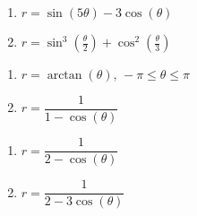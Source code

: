 \documentclass{ximera}
\begin{document}
\begin{multicols}{2} 

\begin{enumerate}

\setcounter{enumi}{\value{HW}}

\item $r = \sin(5\theta) - 3\cos(\theta)$
\item $r = \sin^{3}\left(\frac{\theta}{2}\right) + \cos^{2}\left(\frac{\theta}{3}\right)$

\setcounter{HW}{\value{enumi}}

\end{enumerate}

\end{multicols}

\begin{multicols}{2} 

\begin{enumerate}

\setcounter{enumi}{\value{HW}}

\item $r = \arctan(\theta), \, -\pi \leq \theta \leq \pi$  
\item $r = \dfrac{1}{1 - \cos(\theta)}$

\setcounter{HW}{\value{enumi}}

\end{enumerate}

\end{multicols}

\begin{multicols}{2} 

\begin{enumerate}

\setcounter{enumi}{\value{HW}}

\item $r = \dfrac{1}{2 - \cos(\theta)}$
\item $r = \dfrac{1}{2 - 3\cos(\theta)}$ \label{polarcalclast}

\setcounter{HW}{\value{enumi}}

\end{enumerate}

\end{multicols}
\end{document}
